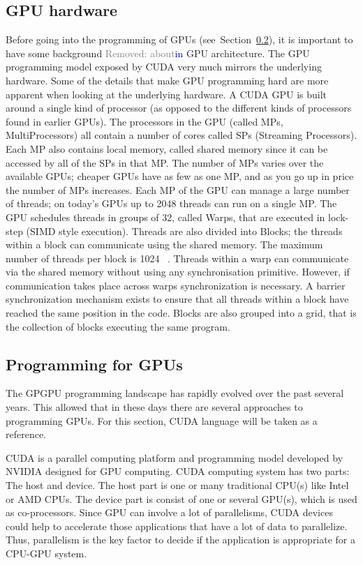 \documentclass[Ingles]{ic-tese-v1}
\newcommand{\rem}[1]{\noindent\textcolor{gray}{Removed: {#1}}}
\newcommand{\new}[1]{\noindent\textcolor{blue}{ {#1}}}
\newcommand{\rem}[1]{}
\newcommand{\new}[1]{#1}
\newcommand{\rsec}[1]{Section~\ref{sec:#1}}
\begin{document}
\subsection{GPU hardware}
\label{sec:gpugardware}
Before going into the programming of GPUs (see~\rsec{gpuprogramming}), it is important to have some background \rem{about}\new{in} GPU architecture.
The GPU programming model exposed by CUDA very much mirrors the underlying
hardware. Some of the details that make GPU programming hard are more apparent
when looking at the underlying hardware.
A CUDA GPU is built around a single kind of processor (as opposed to the different
kinds of processors found in earlier GPUs). The processors in the GPU (called
MPs, MultiProcessors) all contain a number of cores called SPs (Streaming Processors).
Each MP also contains local memory, called shared memory since it can be
accessed by all of the SPs in that MP. The number of MPs varies over the available
GPUs; cheaper GPUs have as few as one MP, and as you go up in price the number
of MPs increases.
Each MP of the GPU can manage a large number of threads; on today’s GPUs
up to 2048 threads can run on a single MP. The GPU schedules threads in groups
of 32, called Warps, that are executed in lock-step (SIMD style execution). Threads are also divided into Blocks; the threads within a block can communicate using the
shared memory. The maximum number of threads per block is 1024 ~\cite{NvidiaGuide2018}. Threads within
a warp can communicate via the shared memory without using any synchronisation
primitive. However, if communication takes place across warps synchronization is
necessary. A barrier synchronization mechanism exists to ensure that all threads
within a block have reached the same position in the code. Blocks are also grouped
into a grid, that is the collection of blocks executing the same program.

\subsection{Programming for GPUs}
\label{sec:gpuprogramming}
The GPGPU programming landscape has rapidly evolved over the past several years. This allowed that in these days there are several approaches to programming GPUs. For this section, CUDA language will be taken as a reference.

CUDA is a parallel computing platform and programming model developed by NVIDIA designed for GPU computing.
CUDA computing system has two parts: The host and device.
The host part is one or many traditional CPU(s) like Intel or AMD CPUs. The
device part is consist of one or several GPU(s), which is used as co-processors. Since
GPU can involve a lot of parallelisms, CUDA devices could help to accelerate those applications that have a lot of data to  parallelize. Thus, parallelism is the key factor to decide if the application is appropriate for a CPU-GPU system.
\end{document}
